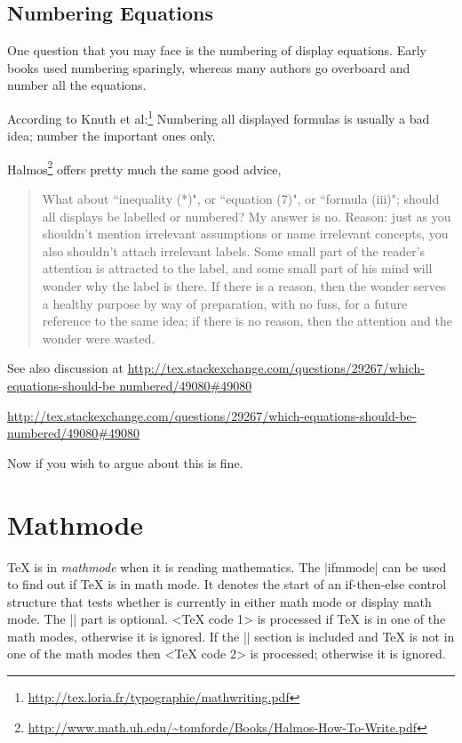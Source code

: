 {\subsection{Numbering Equations}

One question that you may face is the numbering of display equations. Early books used numbering sparingly, whereas many authors go overboard and number all the equations.

According to Knuth et al:\footnote{\url{http://tex.loria.fr/typographie/mathwriting.pdf}}
Numbering all displayed formulas is usually a bad idea; number the important ones only.

Halmos\footnote{\url{http://www.math.uh.edu/~tomforde/Books/Halmos-How-To-Write.pdf}} offers pretty much the same good advice,

\begin{quotation}
What about ``inequality (*)", or ``equation (7)", or ``formula (iii)"; should all displays be labelled or numbered? My answer is no. Reason: just as you shouldn't mention irrelevant assumptions or name irrelevant concepts, you also shouldn't attach irrelevant labels. Some small part of the reader's attention is attracted to the label, and some small part of his mind will wonder why the label is there. If there is a reason, then the wonder serves a healthy purpose by way of preparation, with no fuss, for a future reference to the same idea; if there is no reason, then the attention and the wonder were wasted.
\end{quotation}

See also discussion at \url{http://tex.stackexchange.com/questions/29267/which-equations-should-be numbered/49080\#49080}

\url{http://tex.stackexchange.com/questions/29267/which-equations-should-be-numbered/49080#49080}

Now if you wish to argue about this is fine.

\section{Mathmode}

TeX is in \textit{mathmode} when it is reading mathematics. The |ifmmode| can be used to find out if TeX is in math mode. It denotes the start of an if-then-else control structure that tests whether \tex is currently in either math mode or display math mode. The |\else| part is optional. <TeX code 1> is processed if TeX is in one of the math modes, otherwise it is ignored. If the |\else| section is included and TeX is not in one of the math modes then <TeX code 2> is processed; otherwise it is ignored.


}
